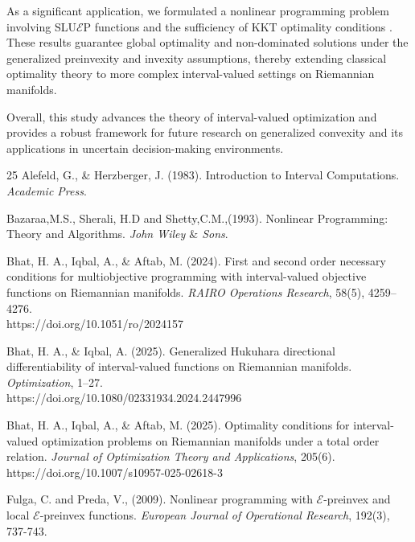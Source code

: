 \documentclass[12pt, reqno]{amsart}
\theoremstyle{definition}
\theoremstyle{remark}
\numberwithin{equation}{section}
\begin{document}
As a significant application, we formulated a nonlinear programming problem involving SLU$\mathcal{E}$P functions and the sufficiency of KKT optimality conditions . These results guarantee global optimality and non-dominated solutions under the generalized preinvexity and invexity assumptions, thereby extending classical optimality theory to more complex interval-valued settings on Riemannian manifolds.

Overall, this study advances the theory of interval-valued optimization and provides a robust framework for future research on generalized convexity and its applications in uncertain decision-making environments.
           
       \begin{thebibliography}{25}
  Alefeld, G., \& Herzberger, J. (1983). Introduction to Interval Computations. \textit{Academic Press}.

   Bazaraa,M.S., Sherali, H.D and  Shetty,C.M.,(1993). Nonlinear Programming: Theory and Algorithms. \textit{John Wiley $\&$ Sons}.
       	

 Bhat, H. A., Iqbal, A., \& Aftab, M. (2024). First and second order necessary conditions for multiobjective programming with interval-valued objective functions on Riemannian manifolds. \textit{RAIRO Operations Research}, 58(5), 4259–4276.\\
https://doi.org/10.1051/ro/2024157

 Bhat, H. A., \& Iqbal, A. (2025). Generalized Hukuhara directional differentiability of interval-valued functions on Riemannian manifolds. \textit{Optimization}, 1–27.\\
https://doi.org/10.1080/02331934.2024.2447996

 Bhat, H. A., Iqbal, A., \& Aftab, M. (2025). Optimality conditions for interval-valued optimization problems on Riemannian manifolds under a total order relation. \textit{Journal of Optimization Theory and Applications}, 205(6).\\
https://doi.org/10.1007/s10957-025-02618-3
     	
 Fulga, C. and Preda, V., (2009). Nonlinear programming with $\mathcal{E}$-preinvex and local $\mathcal{E}$-preinvex functions.  \textit{European Journal of Operational Research}, 192(3), 737-743.
        


\end{thebibliography}
\end{document}
